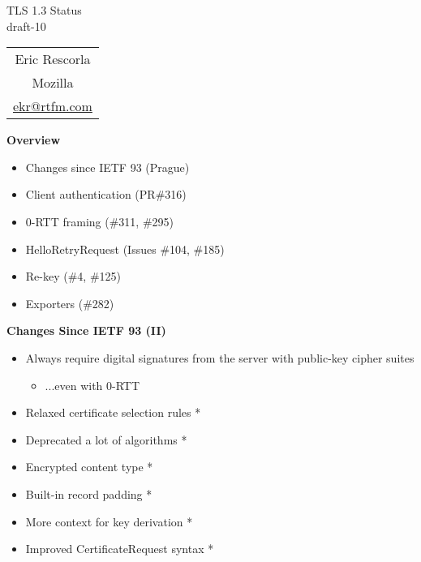 \documentclass[helvetica]{seminar}
\newcommand{\heading}[1]{%
  \begin{center} 
    \large\bf 
    #1 
  \end{center} 
  \vspace{.4 in}}
\begin{document}
\begin{slide}
\begin{center}
\vspace{.5 in}
\LARGE{{\bf}TLS 1.3 Status\\draft-10}\\
\vspace{.2in}
\large{
\begin{tabular}{c}
Eric Rescorla\\
Mozilla\\
\url{ekr@rtfm.com}
\end{tabular}
}
\end{center}

\end{slide}

\centerslidesfalse 


\begin{slide}
\heading{Overview}

\begin{itemize}
\item Changes since IETF 93 (Prague)
\item Client authentication (PR\#316)
\item 0-RTT framing (\#311, \#295)
\item HelloRetryRequest (Issues \#104, \#185)
\item Re-key (\#4, \#125)
\item Exporters (\#282)
\end{itemize}

\end{slide}

\begin{slide}
\heading{Changes Since IETF 93 (II)}

\begin{itemize}
\item Always require digital signatures from the server with public-key cipher suites
  \begin{itemize}
  \item ...even with 0-RTT
  \end{itemize}

\item Relaxed certificate selection rules *
\item Deprecated a lot of algorithms *
\item Encrypted content type *
\item Built-in record padding *
\item More context for key derivation *
\item Improved CertificateRequest syntax *
\end{itemize}
\end{slide}
\end{document}
